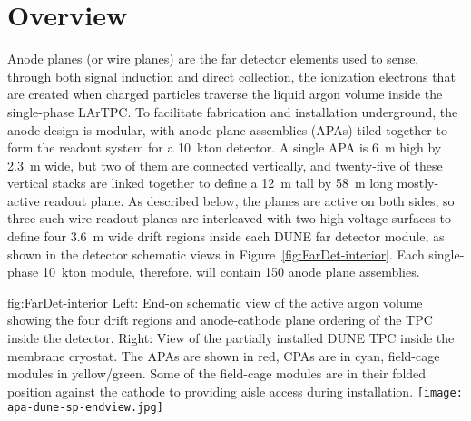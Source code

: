 \section{Overview}
\label{sec:fdsp-apa-intro}

Anode planes (or wire planes) are the far detector elements used to sense, through both signal induction and direct collection, the ionization electrons that are created when charged particles traverse the liquid argon volume inside the single-phase LArTPC. To facilitate fabrication and installation underground, the anode design is modular, with anode plane assemblies (APAs) tiled together to form the readout system for a \SI{10}{kton} detector. A single APA is \SI{6}{m} high by \SI{2.3}{m} wide, but two of them are connected vertically, and twenty-five of these vertical stacks are linked together to define a \SI{12}{m} tall by \SI{58}{m} long mostly-active readout plane.  As described below, the planes are active on both sides, so three such wire readout planes are interleaved with two high voltage surfaces to define four \SI{3.6}{m} wide drift regions inside each DUNE far detector module, as shown in the detector schematic views in Figure~\ref{fig:FarDet-interior}.  Each single-phase \SI{10}{kton} module, therefore, will contain 150 anode plane assemblies.

\begin{dunefigure}{fig:FarDet-interior}
{Left: End-on schematic view of the active argon volume showing the four drift regions and anode-cathode plane ordering of the TPC inside the detector. Right: View of the partially installed DUNE TPC inside the membrane cryostat. The APAs are shown in red, CPAs are in cyan, field-cage modules in yellow/green.  Some of the field-cage modules are in their folded position against the cathode to providing aisle access during installation.}
\setlength{\fboxsep}{0pt}
\setlength{\fboxrule}{0.5pt}
\texttt{[image: apa-dune-sp-endview.jpg]}\hspace{0.01\textwidth}
\end{dunefigure}

